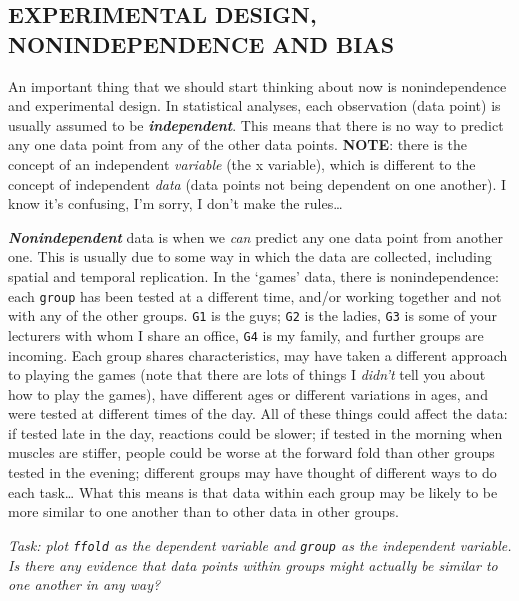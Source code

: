 \documentclass[
]{book}
\begin{document}
\hypertarget{experimental-design-nonindependence-and-bias}{%
\subsection{EXPERIMENTAL DESIGN, NONINDEPENDENCE AND BIAS}\label{experimental-design-nonindependence-and-bias}}

An important thing that we should start thinking about now is nonindependence and
experimental design. In statistical analyses, each observation (data point) is usually
assumed to be \emph{\textbf{independent}}. This means that there is no way to predict any one
data point from any of the other data points. \textbf{NOTE}: there is
the concept of an independent \emph{variable} (the x variable), which is different
to the concept of independent \emph{data} (data points not being dependent on one
another). I know it's confusing, I'm sorry, I don't make the rules\ldots{}

\emph{\textbf{Nonindependent}} data is when we \emph{can} predict any one data point from
another one. This is usually due to some way in which the data are collected,
including spatial and temporal replication. In the `games' data, there is
nonindependence: each \texttt{group} has been tested at a different time, and/or
working together and not with any of the other groups. \texttt{G1} is the guys; \texttt{G2} is the ladies,
\texttt{G3} is some of your lecturers with whom I share an office,
\texttt{G4} is my family, and further groups are incoming. Each group shares
characteristics, may have taken a different approach to playing the games
(note that there are lots of things I \emph{didn't} tell you about how to play the games),
have different ages or different variations in ages, and were tested at different
times of the day. All of these things could affect the data: if tested late
in the day, reactions could be slower; if tested in the morning when muscles
are stiffer, people could be worse at the forward
fold than other groups tested in the evening; different groups may have
thought of different ways to do each task\ldots{} What this means is that data
within each group may be likely to be more similar to one another than to
other data in other groups.

\emph{Task: plot \texttt{ffold} as the dependent variable and \texttt{group} as the independent
variable. Is there any evidence that data points within groups might
actually be similar to one another in any way?}\\
~\\
\end{document}
